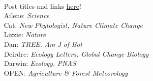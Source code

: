 \documentclass[11pt]{article}
\begin{document}
\vspace{10pt}\\
 Post titles and links \href{https://docs.google.com/document/d/1j0WdDbjdp8ERLSO7whvtnP-tOblYMlX33TSCXy_uRKo/edit?usp=sharing}{\underline{here}}!\\
Ailene: \emph{Science}\\
Cat: \emph{New Phytologist, Nature Climate Change}\\
Lizzie: \emph{Nature}\\
Dan: \emph{TREE, Am J of Bot }\\
Deirdre: \emph{Ecology Letters, Global Change Biology}\\
Darwin: \emph{Ecology, PNAS}\\
OPEN: \emph{Agriculture \& Forest Meteorology}\\
\end{document}
